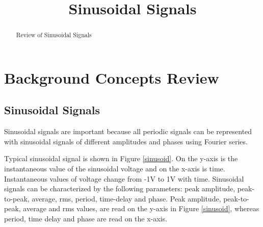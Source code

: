 \documentclass{ximera}
\title{Sinusoidal Signals}
\begin{document}
  
\begin{abstract}  
Review of Sinusoidal Signals
\end{abstract}  

\chapter{Background Concepts Review}

\section{Sinusoidal Signals}
Sinusoidal signals are important  because all periodic signals can be represented with sinusoidal signals of different amplitudes and phases using Fourier series. 

Typical sinusoidal signal is shown in Figure \ref{sinusoid}. On the y-axis is the instantaneous value of the sinusoidal voltage and on the x-axis is time. Instantaneous values of voltage change from -1V to 1V with time. Sinusoidal signals can be characterized by the following parameters: peak amplitude, peak-to-peak, average, rms, period, time-delay and phase. Peak amplitude, peak-to-peak, average and rms values, are read on the y-axis in Figure \ref{sinusoid}, whereas period, time delay and phase are read on the x-axis.
\end{document}
